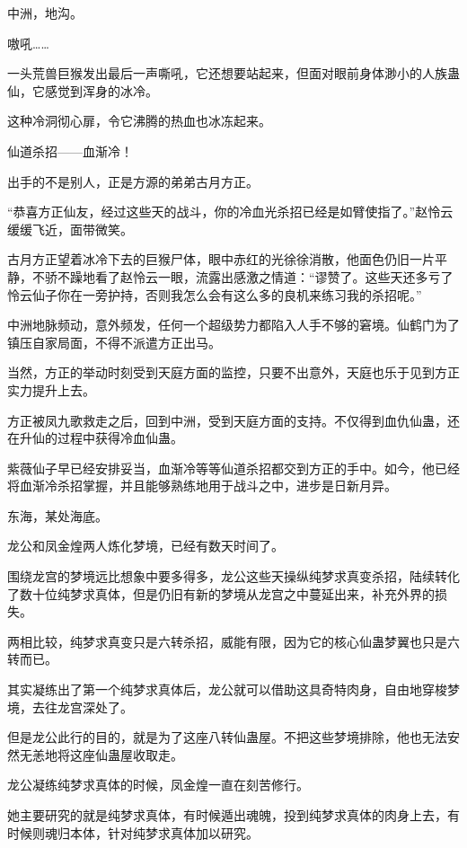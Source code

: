 
\begin{this_body}

中洲，地沟。

嗷吼……

一头荒兽巨猴发出最后一声嘶吼，它还想要站起来，但面对眼前身体渺小的人族蛊仙，它感觉到浑身的冰冷。

这种冷洞彻心扉，令它沸腾的热血也冰冻起来。

仙道杀招——血渐冷！

出手的不是别人，正是方源的弟弟古月方正。

“恭喜方正仙友，经过这些天的战斗，你的冷血光杀招已经是如臂使指了。”赵怜云缓缓飞近，面带微笑。

古月方正望着冰冷下去的巨猴尸体，眼中赤红的光徐徐消散，他面色仍旧一片平静，不骄不躁地看了赵怜云一眼，流露出感激之情道：“谬赞了。这些天还多亏了怜云仙子你在一旁护持，否则我怎么会有这么多的良机来练习我的杀招呢。”

中洲地脉频动，意外频发，任何一个超级势力都陷入人手不够的窘境。仙鹤门为了镇压自家局面，不得不派遣方正出马。

当然，方正的举动时刻受到天庭方面的监控，只要不出意外，天庭也乐于见到方正实力提升上去。

方正被凤九歌救走之后，回到中洲，受到天庭方面的支持。不仅得到血仇仙蛊，还在升仙的过程中获得冷血仙蛊。

紫薇仙子早已经安排妥当，血渐冷等等仙道杀招都交到方正的手中。如今，他已经将血渐冷杀招掌握，并且能够熟练地用于战斗之中，进步是日新月异。

东海，某处海底。

龙公和凤金煌两人炼化梦境，已经有数天时间了。

围绕龙宫的梦境远比想象中要多得多，龙公这些天操纵纯梦求真变杀招，陆续转化了数十位纯梦求真体，但是仍旧有新的梦境从龙宫之中蔓延出来，补充外界的损失。

两相比较，纯梦求真变只是六转杀招，威能有限，因为它的核心仙蛊梦翼也只是六转而已。

其实凝练出了第一个纯梦求真体后，龙公就可以借助这具奇特肉身，自由地穿梭梦境，去往龙宫深处了。

但是龙公此行的目的，就是为了这座八转仙蛊屋。不把这些梦境排除，他也无法安然无恙地将这座仙蛊屋收取走。

龙公凝练纯梦求真体的时候，凤金煌一直在刻苦修行。

她主要研究的就是纯梦求真体，有时候遁出魂魄，投到纯梦求真体的肉身上去，有时候则魂归本体，针对纯梦求真体加以研究。


\end{this_body}
